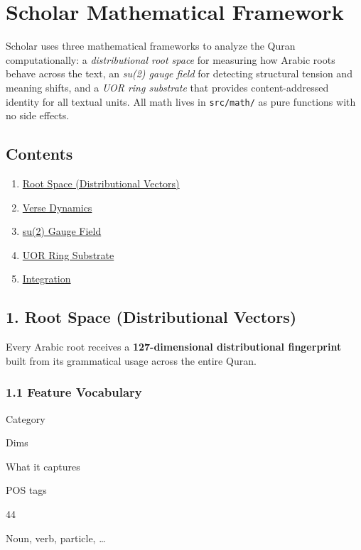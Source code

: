 \documentclass[12pt,a4paper]{article}
\providecommand{\tightlist}{\setlength{\itemsep}{0pt}\setlength{\parskip}{0pt}}
\begin{document}
\section{Scholar Mathematical
Framework}\label{scholar-mathematical-framework}

Scholar uses three mathematical frameworks to analyze the Quran
computationally: a \emph{distributional root space} for measuring how
Arabic roots behave across the text, an \emph{su(2) gauge field} for
detecting structural tension and meaning shifts, and a \emph{UOR ring
substrate} that provides content-addressed identity for all textual
units. All math lives in \texttt{src/math/} as pure functions with no
side effects.

\subsection{Contents}\label{contents}

\begin{enumerate}
\tightlist
\item
  \hyperref[root-space]{Root Space (Distributional Vectors)}
\item
  \hyperref[verse-dynamics]{Verse Dynamics}
\item
  \hyperref[gauge]{su(2) Gauge Field}
\item
  \hyperref[uor]{UOR Ring Substrate}
\item
  \hyperref[integration]{Integration}
\end{enumerate}

\subsection{1. Root Space (Distributional Vectors)}\label{root-space}

Every Arabic root receives a \textbf{127-dimensional distributional
fingerprint} built from its grammatical usage across the entire Quran.

\subsubsection{1.1 Feature Vocabulary}\label{feature-vocabulary}

Category

Dims

What it captures

POS tags

44

Noun, verb, particle, \ldots{}
\end{document}
